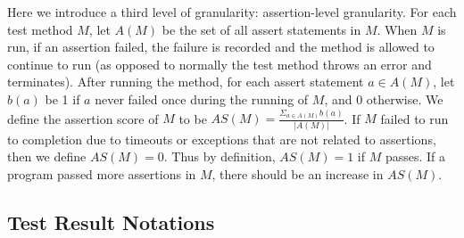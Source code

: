 \documentclass[sigconf, timestamp-false, anonymous=true]{acmart}
\begin{document}
Here we introduce a third level of granularity: assertion-level granularity. For each test method $M$, let $A(M)$ be the set of all assert statements in $M$. When $M$ is run, if an assertion failed, the failure is recorded and the method is allowed to continue to run (as opposed to normally the test method throws an error and terminates). After running the method, for each assert statement $a\in A(M)$, let $b(a)$ be 1 if $a$ never failed once during the running of $M$, and 0 otherwise. We define the assertion score of $M$ to be $AS(M)=\frac{\Sigma_{a\in A(M)}b(a)}{|A(M)|}$. If $M$ failed to run to completion due to timeouts or exceptions that are not related to assertions, then we define $AS(M)=0$. Thus by definition, $AS(M)=1$ if $M$ passes. If a program passed more assertions in $M$, there should be an increase in $AS(M)$.

\subsection{Test Result Notations}
\end{document}

